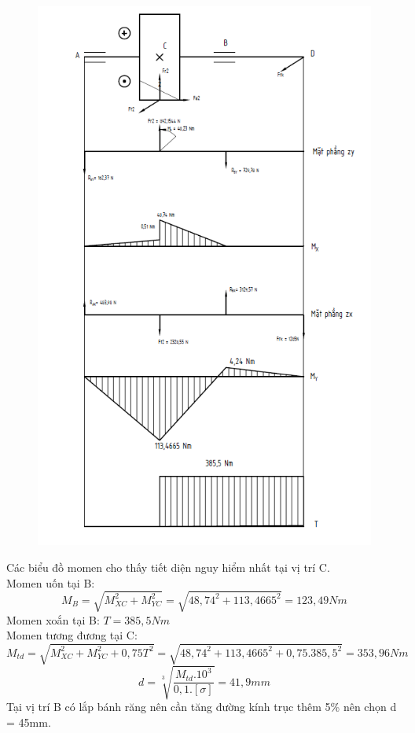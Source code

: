 \begin{figure}[H]
    \centering
    \includegraphics[width=1\textwidth]{pictures/luctruc2.png}
\end{figure}
Các biểu đồ momen cho thấy tiết diện nguy hiểm nhất tại vị trí C. \\
Momen uốn tại B:
\[
    M_B = \sqrt{M_{XC}^2 + M_{YC}^2} = \sqrt{48,74^2 + 113,4665^2} = 123,49Nm
\]
Momen xoắn tại B: $T = 385,5Nm$ \\
Momen tương đương tại C:
\[
    M_{td} = \sqrt{M_{XC}^2 + M_{YC}^2 + 0,75T^2} = \sqrt{48,74^2 + 113,4665^2 + 0,75.385,5^2} = 353,96Nm
\]
\[
d = \sqrt[3]{\frac{M_{td}.10^3}{0,1.[\sigma]}} = 41,9 mm
\]
Tại vị trí B có lắp bánh răng nên cần tăng đường kính trục thêm 5\% nên chọn d = 45mm.
